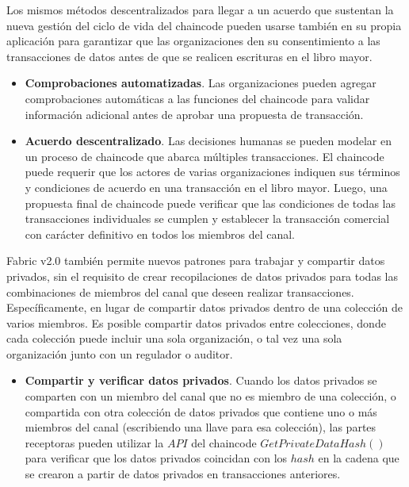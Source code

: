 {Los mismos m\'etodos descentralizados para llegar a un acuerdo que sustentan la nueva gesti\'on del ciclo de vida del chaincode pueden usarse tambi\'en en su propia aplicaci\'on para garantizar que las organizaciones den su consentimiento a las transacciones de datos antes de que se realicen escrituras en el libro mayor.\\

\begin{itemize}
\item {\bf Comprobaciones automatizadas}. Las organizaciones pueden agregar comprobaciones autom\'aticas a las funciones del chaincode para validar informaci\'on adicional antes de aprobar una propuesta de transacci\'on.

\item {\bf Acuerdo descentralizado}. Las decisiones humanas se pueden modelar en un proceso de chaincode que abarca m\'ultiples transacciones. El chaincode puede requerir que los actores de varias organizaciones indiquen sus t\'erminos y condiciones de acuerdo en una transacci\'on en el libro mayor. Luego, una propuesta final de chaincode puede verificar que las condiciones de todas las transacciones individuales se cumplen y establecer la transacci\'on comercial con car\'acter definitivo en todos los miembros del canal.
\end{itemize}

Fabric v2.0 tambi\'en permite nuevos patrones para trabajar y compartir datos privados, sin el requisito de crear recopilaciones de datos privados para todas las combinaciones de miembros del canal que deseen realizar transacciones. Espec\'ificamente, en lugar de compartir datos privados dentro de una colecci\'on de varios miembros. Es posible compartir datos privados entre colecciones, donde cada colecci\'on puede incluir una sola organizaci\'on, o tal vez una sola organizaci\'on junto con un regulador o auditor.\\

\begin{itemize}
\item {\bf Compartir y verificar datos privados}. Cuando los datos privados se comparten con un miembro del canal que no es miembro de una colecci\'on, o compartida con otra colecci\'on de datos privados que contiene uno o m\'as miembros del canal (escribiendo una llave para esa colecci\'on), las partes receptoras pueden utilizar la $API$ del chaincode $GetPrivateDataHash()$ para verificar que los datos privados coincidan con los $hash$ en la cadena que se crearon a partir de datos privados en transacciones anteriores.


\end{itemize}}
